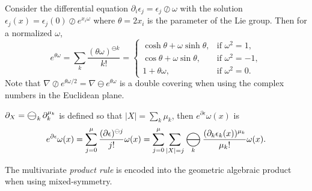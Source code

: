 \documentclass{juliacon}
\DeclareMathOperator*{\bigominus}{\scalerel*{\ominus}{\bigodot}}
\begin{document}
Consider the differential equation $ \partial_i\epsilon_j = \epsilon_j\oslash\omega$ with the solution $\epsilon_j(x) = \epsilon_j(0)\oslash e^{x_i\omega} $ where $\theta =2 x_i$ is the parameter of the Lie group. Then for a normalized $\omega$,
$$ e^{\theta\omega} = \sum_k \frac{(\theta\omega)^{\ominus k}}{k!} = \begin{cases} \cosh\theta+\omega\sinh\theta, & \text{if } \omega^2 = 1, \\ \cos\theta + \omega\sin\theta, & \text{if } \omega^2=-1, \\ 1+\theta\omega, & \text{if } \omega^2=0. \end{cases} $$
Note that $\nabla\oslash e^{\theta\omega/2} = \nabla \ominus e^{\theta\omega}$ is a double covering when using the complex numbers in the Euclidean plane.
\begin{theorem}
	$\partial_X=\bigominus_k\partial_k^{\mu_k}$ is defined so that $|X|=\sum_k\mu_k$, then $e^{\partial\epsilon}\omega(x)$ is
	\begin{align*}
		e^{\partial\epsilon}\omega(x) =
		\sum_{j=0}^\mu \frac{(\partial\epsilon)^{\ominus j}}{j!}\omega(x)
		= \sum_{j=0}^\mu\sum_{|X|=j} \bigominus_k \frac{(\partial_{k}\epsilon_k(x))^{\mu_{k}}}{\mu_k!}\omega(x).
	\end{align*}
\end{theorem}
The multivariate \textit{product rule} is encoded into the geometric algebraic product when using mixed-symmetry.
\end{document}

